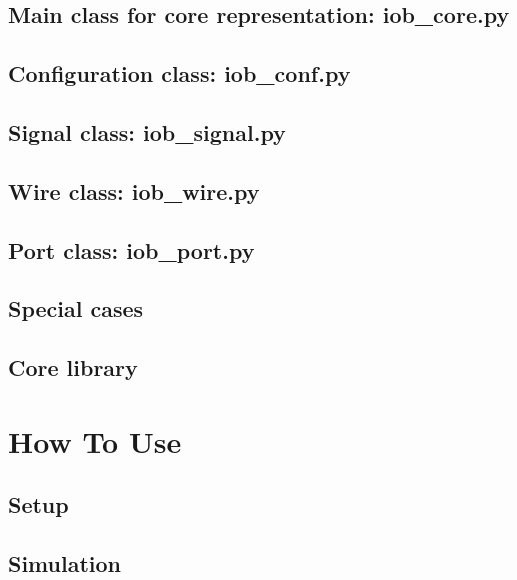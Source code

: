 \documentclass{ug}
\begin{document}
\subsection{Main class for core representation: iob\_core.py}
\label{sec:iob_core}


\subsection{Configuration class: iob\_conf.py}
\label{sec:iob_conf}


\subsection{Signal class: iob\_signal.py}
\label{sec:iob_signal}


\subsection{Wire class: iob\_wire.py}
\label{sec:iob_wire}


\subsection{Port class: iob\_port.py}
\label{sec:iob_port}


\subsection{Special cases}
\label{sec:special_cases}


\subsection{Core library}
\label{sec:core_lib}


%
%
\ifdefined\SECTIONCLEARPAGE
\clearpage
\fi
\section{How To Use}
\label{sec:usage}

\subsection{Setup}
\label{sec:setup}


\subsection{Simulation}
\label{sec:sim}

\end{document}
